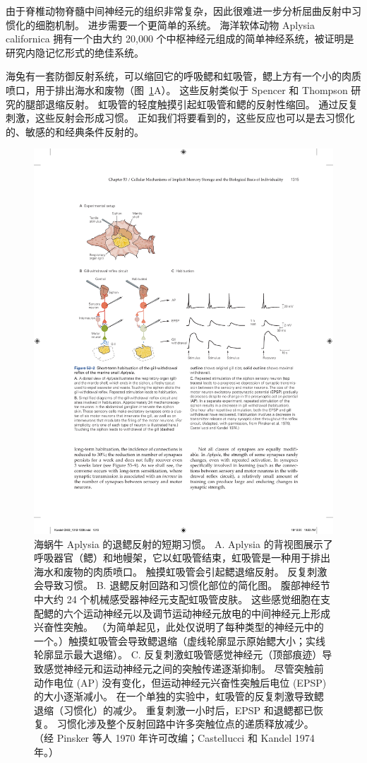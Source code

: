 由于脊椎动物脊髓中间神经元的组织非常复杂，因此很难进一步分析屈曲反射中习惯化的细胞机制。
进步需要一个更简单的系统。
海洋软体动物 Aplysia californica 拥有一个由大约 20,000 个中枢神经元组成的简单神经系统，被证明是研究内隐记忆形式的绝佳系统。


海兔有一套防御反射系统，可以缩回它的呼吸鳃和虹吸管，鳃上方有一个小的肉质喷口，用于排出海水和废物（图~\ref{fig:53_2}A）。
这些反射类似于 Spencer 和 Thompson 研究的腿部退缩反射。
虹吸管的轻度触摸引起虹吸管和鳃的反射性缩回。
通过反复刺激，这些反射会形成习惯。
正如我们将要看到的，这些反应也可以是去习惯化的、敏感的和经典条件反射的。


\begin{figure}[htbp]
	\centering
	\includegraphics[width=0.9\linewidth]{chap53/fig_53_2}
	\caption{海蜗牛 Aplysia 的退鳃反射的短期习惯。 A. Aplysia 的背视图展示了呼吸器官（鳃）和地幔架，它以虹吸管结束，虹吸管是一种用于排出海水和废物的肉质喷口。 触摸虹吸管会引起鳃退缩反射。 反复刺激会导致习惯。 B. 退鳃反射回路和习惯化部位的简化图。 腹部神经节中大约 24 个机械感受器神经元支配虹吸管皮肤。 这些感觉细胞在支配鳃的六个运动神经元以及调节运动神经元放电的中间神经元上形成兴奋性突触。 （为简单起见，此处仅说明了每种类型的神经元中的一个。）触摸虹吸管会导致鳃退缩（虚线轮廓显示原始鳃大小；实线轮廓显示最大退缩）。 C. 反复刺激虹吸管感觉神经元（顶部痕迹）导致感觉神经元和运动神经元之间的突触传递逐渐抑制。 尽管突触前动作电位 (AP) 没有变化，但运动神经元兴奋性突触后电位 (EPSP) 的大小逐渐减小。 在一个单独的实验中，虹吸管的反复刺激导致鳃退缩（习惯化）的减少。 重复刺激一小时后，EPSP 和退鳃都已恢复。 习惯化涉及整个反射回路中许多突触位点的递质释放减少。 （经 Pinsker 等人 1970 年许可改编；Castellucci 和 Kandel 1974 年。）}
	\label{fig:53_2}
\end{figure}


